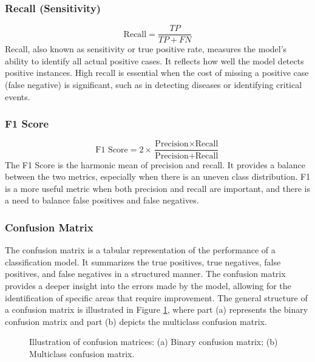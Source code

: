 \documentclass[12pt,a4paper]{report}
\begin{document}
\subsubsection*{ Recall (Sensitivity)}
\[
\text{Recall} = \frac{TP}{TP + FN}
\]
Recall, also known as sensitivity or true positive rate, measures the model's ability to identify all actual positive cases. It reflects how well the model detects positive instances. High recall is essential when the cost of missing a positive case (false negative) is significant, such as in detecting diseases or identifying critical events.

\subsubsection*{F1 Score}
\[
\text{F1 Score} = 2 \times \frac{\text{Precision} \times \text{Recall}}{\text{Precision} + \text{Recall}}
\]
The F1 Score is the harmonic mean of precision and recall. It provides a balance between the two metrics, especially when there is an uneven class distribution. F1 is a more useful metric when both precision and recall are important, and there is a need to balance false positives and false negatives.

\subsubsection*{Confusion Matrix}

\hspace{1cm}The confusion matrix is a tabular representation of the performance of a classification model. It summarizes the true positives, true negatives, false positives, and false negatives in a structured manner. The confusion matrix provides a deeper insight into the errors made by the model, allowing for the identification of specific areas that require improvement. The general structure of a confusion matrix is illustrated in Figure \ref{fig:Confusion_Matrix}, where part (a) represents the binary confusion matrix and part (b) depicts the multiclass confusion matrix.

\begin{figure}[h]
	\renewcommand\thefigure{3.4}
	\centering
	\caption{Illustration of confusion matrices: (a) Binary confusion matrix; (b) Multiclass confusion matrix.}
	\label{fig:Confusion_Matrix}
\end{figure}
\end{document}
